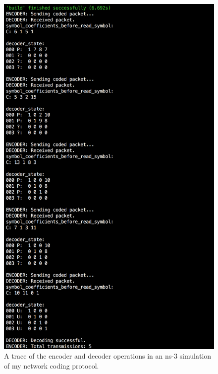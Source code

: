 \documentclass[12pt,a4paper,twoside,openright]{report}
\begin{document}
\begin{figure}[tbh]
	\centerline{\includegraphics[scale=0.7]{figs/trace}}
	\caption{A trace of the encoder and decoder operations in an ns-3 simulation of my network coding protocol.}
	\label{fig:trace}
\end{figure}
\end{document}
